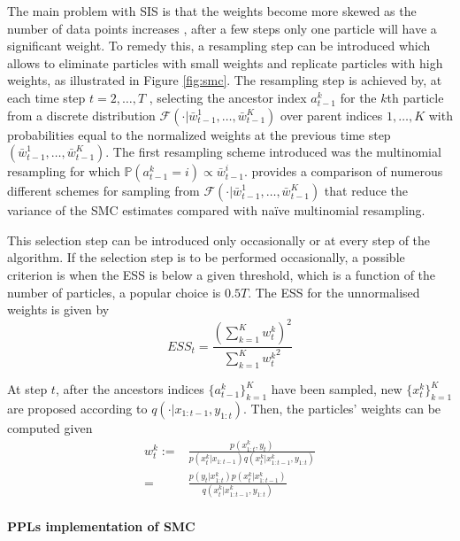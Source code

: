 The main problem with \gls{SIS} is that the weights become more skewed as the number of data points increases \cite{Anonymous:2001ue}, after a few steps only one particle will have a significant weight. To remedy this, a resampling step can be introduced which allows to eliminate particles with small weights and replicate particles with high weights, as illustrated in Figure \ref{fig:smc}.
The resampling step is achieved by, at each time step $t = 2, \dots , T$ ,
selecting the ancestor index $a^k_{t-1}$ for the $k$th particle from a discrete distribution 
$\mathcal{F} (\cdot|\bar{w}^1_{t-1},\dots, \bar{w}^K_{t-1})$
over parent indices ${1, \dots , K }$ with probabilities equal to the normalized weights at the previous time step $(\bar{w}^1_{t-1},\dots, \bar{w}^K_{t-1})$. The first resampling scheme introduced was the multinomial resampling for which $\mathbb{P}(a^k_{t-1} = i) \propto \bar{w}^i_{t-1}$. \cite{Douc:2005wa} provides a comparison of numerous different schemes for sampling from $\mathcal{F} (\cdot|\bar{w}^1_{t-1},\dots, \bar{w}^K_{t-1})$ that reduce the variance of the \gls{SMC} estimates compared with naïve multinomial resampling.

This selection step can be introduced only occasionally or at every step of the algorithm.
If the selection step is to be performed occasionally, a possible criterion is when the \gls{ESS} is below a given threshold, which is a function of the number of particles, a popular choice is $0.5T$. The \gls{ESS} for the unnormalised weights is given by
$$ ESS_t = \frac{{\left( \sum_{k=1}^K{w_t^k} \right)}^2}{\sum_{k=1}^K{{w_t^k}^2}}$$

At step $t$, after the ancestors indices $\{a^k_{t-1}\}_{k=1}^K$ have been sampled, new $\{x_{t}^k\}_{k=1}^K$ are proposed according to $q(\cdot|x_{1:t-1},y_{1:t})$. Then, the particles' weights can be computed given
\begin{equation*} \label{eq:SMC_weights}
\begin{aligned}
w_{t}^k :=& \frac{p(x^k_{1:t},y_{t})}{p(x^k_{t}|x_{1:t-1}) q(x^k_{t}|x^k_{1:t-1},y_{1:t})}\\
=& \frac{p(y_{t}|x^k_{1:t})p(x^k_{t}|x^k_{1:t-1})}{q(x^k_{t}|x^k_{1:t-1},y_{1:t})}
\end{aligned}
\end{equation*}

\paragraph{\glspl{PPL} implementation of \gls{SMC}}

